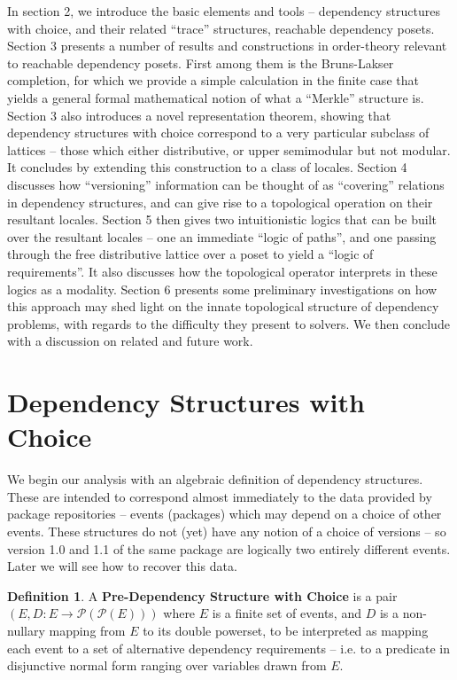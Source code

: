 \documentclass[hoptionsi,review,screen,format=sigconf]{acmart}
\theoremstyle{definition}
\newtheorem{definition}{Definition}[section]
\newcommand{\Pc}{\mathcal{P}}
\begin{document}
In section 2, we introduce the basic elements and tools -- dependency structures with choice, and their related ``trace'' structures, reachable dependency posets. Section 3 presents a number of results and constructions in order-theory relevant to reachable dependency posets. First among them is the Bruns-Lakser completion, for which we provide a simple calculation in the finite case that yields a general formal mathematical notion of what a ``Merkle'' structure is. Section 3 also introduces a novel representation theorem, showing that dependency structures with choice correspond to a very particular subclass of lattices -- those which either distributive, or upper semimodular but not modular. It concludes by extending this construction to a class of locales. Section 4 discusses how ``versioning'' information can be thought of as ``covering'' relations in dependency structures, and can give rise to a topological operation on their resultant locales. Section 5 then gives  two intuitionistic logics that can be built over the resultant locales  -- one an immediate ``logic of paths'', and one passing through the free distributive lattice over a poset to yield a ``logic of requirements''. It also discusses how the topological operator interprets in these logics as a modality. Section 6 presents some preliminary investigations on how this approach may shed light on the innate topological structure of dependency problems, with regards to the difficulty they present to solvers. We then conclude with a discussion on related and future work.

\section{Dependency Structures with Choice}
We begin our analysis with an algebraic definition of dependency structures. These are intended to correspond almost immediately to the data provided by package repositories -- events (packages) which may depend on a choice of other events. These structures do not (yet) have any notion of a choice of versions -- so version 1.0 and 1.1 of the same package are logically two entirely different events. Later we will see how to recover this data.

\begin{definition}
A \textbf{Pre-Dependency Structure with Choice} is a pair \((E, D : E \rightarrow \Pc(\Pc(E)))\) where \(E\) is a finite set of events, and \(D\) is a non-nullary mapping from \(E\) to its double powerset, to be interpreted as mapping each event to a set of alternative dependency requirements -- i.e. to a predicate in disjunctive normal form ranging over variables drawn from \(E\).
\end{definition}
\end{document}
